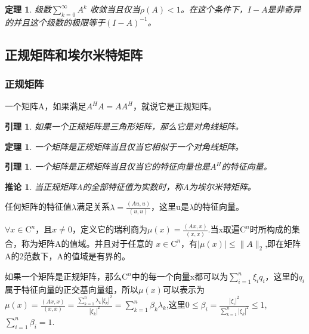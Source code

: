 \documentclass{article}
\begin{document}
\newtheorem{thm}{定理}
\begin{thm}
级数$\sum_{k=0}^\infty A^k$ 收敛当且仅当$\rho (A)<1$。在这个条件下，$I-A$是非奇异的并且这个级数的极限等于$(I-A)^{-1}$。
\end{thm}


\subsection{正规矩阵和埃尔米特矩阵}
\subsubsection{正规矩阵}
一个矩阵A，如果满足$A^HA=AA^H$，就说它是正规矩阵。
\newtheorem{lemma}{引理}
\begin{lemma}
如果一个正规矩阵是三角形矩阵，那么它是对角线矩阵。
\end{lemma}

\newtheorem{thm}{定理}
\begin{thm}
一个矩阵是正规矩阵当且仅当它相似于一个对角线矩阵。
\end{thm}

\newtheorem{lemma}{引理}
\begin{lemma}
一个矩阵是正规矩阵当且仅当它的特征向量也是$A^H$的特征向量。
\end{lemma}

\newtheorem{corollary}{推论}
\begin{corollary}
当正规矩阵A的全部特征值为实数时，称A为埃尔米特矩阵。
\end{corollary}
任何矩阵的特征值$\lambda$满足关系$\lambda =\frac{(Au,u)}{(u,u)}$，这里u是$\lambda$的特征向量。

$\forall x \in\mathrm{C}^n$，且$x\neq 0$，定义它的瑞利商为$\mu (x)=\frac{(Ax,x)}{(x,x)}$.当x取遍$\mathrm{C}^n$时所构成的集合，称为矩阵A的值域。并且对于任意的 $x \in\mathrm{C}^n$，有$|\mu (x)|\leqslant \parallel A\parallel _2$,即在矩阵A的2范数下，A的值域是有界的。

如果一个矩阵是正规矩阵，那么$\mathrm{C}^n$中的每一个向量x都可以为$\sum_{i=1}^n \xi _i q_i$，这里的$q_i$属于特征向量的正交基向量组，所以$\mu (x)$可以表示为$\mu (x)=\frac{(Ax,x)}{(x,x)}=\frac{\sum_{k=1}^n \lambda _k|\xi _k|^2}{|\xi _k|^2}=\sum_{k=1}^n \beta _k\lambda _k$,这里$0\leqslant \beta _i=\frac{|\xi _i|^2}{\sum_{k=1}^n |\xi _k|^2}\leqslant 1$,$\sum_{i=1}^n \beta _i=1$.
\end{document}
